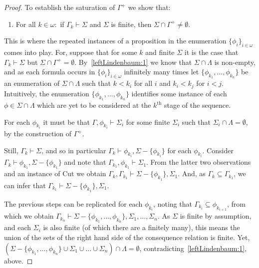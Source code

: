 \documentclass[10pt]{article}
\begin{document}
\begin{lemma}[Lindenbaum]
\begin{proof}
    To establish the saturation of \(\Gamma^{+}\) we show that:
    \begin{enumerate}[label=(\arabic*),resume]
    \item\label{leftLindenbaum:2} For all \(k \in \omega \colon\) if \(\Gamma_{k} \vdash \Sigma\) and \(\Sigma\) is finite, then \(\Sigma \cap \Gamma^{+} \ne \emptyset\).
    \end{enumerate}

    This is where the repeated instances of a proposition in the enumeration \(\{\phi_{i}\}_{i \in \omega}\) comes into play.
    For, suppose that for some \(k\) and finite \(\Sigma\) it is the case that \(\Gamma_{k} \vdash \Sigma\) but \(\Sigma \cap \Gamma^{+} = \emptyset\).
    By~\ref{leftLindenbaum:1} we know that \(\Sigma \cap \Lambda\) is non-empty, and as each formula occurs in \(\{\phi_{i}\}_{i \in \omega}\) infinitely many times let \(\{\phi_{k_{1}}, \dots, \phi_{k_{n}}\}\) be an enumeration of \(\Sigma \cap \Lambda\) such that \(k < k_{i}\) for all \(i\) and \(k_{i} < k_{j}\) for \(i < j\).
    Intuitively, the enumeration \(\{\phi_{k_{1}}, \dots, \phi_{k_{n}}\}\) identifies some instance of each \(\phi \in \Sigma \cap \Lambda\) which are yet to be considered at the \(k^{\text{th}}\) stage of the sequence.

    For each \(\phi_{k_{i}}\) it must be that \mbox{\(\Gamma, \phi_{k_{i}} \vdash \Sigma_{i}\)} for some finite \(\Sigma_{i}\) such that \(\Sigma_{i} \cap \Lambda = \emptyset\), by the construction of \(\Gamma^{+}\).

    Still, \mbox{\(\Gamma_{k} \vdash \Sigma\)}, and so in particular \mbox{\(\Gamma_{k} \vdash \phi_{k_{i}},\Sigma - \{\phi_{k_{i}}\}\)} for each \(\phi_{k_{i}}\).
    Consider \mbox{\(\Gamma_{k} \vdash \phi_{k_{1}},\Sigma - \{\phi_{k_{1}}\}\)} and note that \mbox{\(\Gamma_{k_{1}}, \phi_{k_{1}} \vdash \Sigma_{1}\)}.
    From the latter two observations and an instance of Cut we obtain \mbox{\(\Gamma_{k}, \Gamma_{k_{1}} \vdash \Sigma - \{\phi_{k_{1}}\}, \Sigma_{1}\)}.
    And, as \mbox{\(\Gamma_{k} \subseteq \Gamma_{k_{1}}\)}, we can infer that \mbox{\(\Gamma_{k_{1}} \vdash \Sigma - \{\phi_{k_{1}}\}, \Sigma_{1}\)}.

    The previous steps can be replicated for each \(\phi_{k_{i}}\), noting that \(\Gamma_{k_{i}} \subseteq \phi_{k_{i+1}}\), from which we obtain \mbox{\(\Gamma_{k_{n}} \vdash \Sigma - \{\phi_{k_{1}},\dots,\phi_{k_{n}}\}, \Sigma_{1},\dots,\Sigma_{n}\)}.
    As \(\Sigma\) is finite by assumption, and each \(\Sigma_{i}\) is also finite (of which there are a finitely many), this means the union of the sets of the right hand side of the consequence relation is finite.
    Yet, \((\Sigma - \{\phi_{k_{1}},\dots,\phi_{k_{n}}\} \cup \Sigma_{1} \cup \dots \cup \Sigma_{n}) \cap \Lambda = \emptyset\), contradicting~\ref{leftLindenbaum:1}, above.


\end{proof}
\end{lemma}
\end{document}
